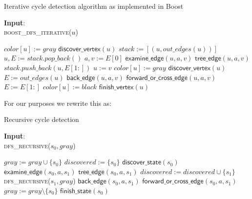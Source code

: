 \documentclass{article}
\begin{document}
\begin{algorithm}
\small
\caption{Iterative cycle detection algorithm as implemented in Boost}
\vspace*{1ex}
{\textbf{Input}:} \\
\textsc{boost\_dfs\_iterative}($u$)
\begin{algorithmic}[1]
\State $color[u] := gray$
\State $\textsf{discover\_vertex}(u)$
\State $stack := [(u, out\_edges(u))]$
  \State $u, E := stack.pop\_back()$
    \State $a, v := E[0]$
    \State $\textsf{examine\_edge}(u, a, v)$
      \State $\textsf{tree\_edge}(u, a, v)$
      \State $stack.push\_back(u, E[1:])$
      \State $u := v$
      \State $color[u] := gray$
      \State $\textsf{discover\_vertex}(u)$
      \State $E := out\_edges(u)$
    \Else
        \State $\textsf{back\_edge}(u, a, v)$
      \Else
        \State $\textsf{forward\_or\_cross\_edge}(u, a, v)$
      \EndIf
      \State $E := E[1:]$
    \EndIf
  \EndWhile
  \State $color[u] := black$
  \State $\textsf{finish\_vertex}(u)$
\EndWhile
\end{algorithmic}
\end{algorithm}

For our purposes we rewrite this as:

\begin{algorithm}
\small
\caption{Recursive cycle detection}
\vspace*{1ex}
{\textbf{Input}:} \\
\textsc{dfs\_recursive}($s_0, gray$)
\begin{algorithmic}[1]
\State $gray := gray \cup \{ s_0 \}$
\State $discovered := \{ s_0 \}$
\State $\textsf{discover\_state}(s_0)$
  \State $\textsf{examine\_edge}(s_0, a, s_1)$
    \State $\textsf{tree\_edge}(s_0, a, s_1)$
    \State $discovered := discovered \cup \{ s_1 \}$
    \State \textsc{dfs\_recursive}($s_1, gray$)
    \State $\textsf{back\_edge}(s_0, a, s_1)$
  \Else
    \State $\textsf{forward\_or\_cross\_edge}(s_0, a, s_1)$
  \EndIf
  \State $gray := gray \setminus \{ s_0 \}$
  \State $\textsf{finish\_state}(s_0)$
\EndFor
\end{algorithmic}
\end{algorithm}
\end{document}
